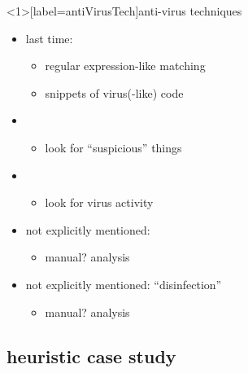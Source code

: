 \begin{frame}<1>[label=antiVirusTech]{anti-virus techniques}
    \begin{itemize}
    \item last time: 
        \begin{itemize}
        \item regular expression-like matching
        \item snippets of virus(-like) code
        \end{itemize}
    \item {}
        \begin{itemize}
        \item look for ``suspicious'' things
        \end{itemize}
    \item {}
        \begin{itemize}
        \item look for virus activity
        \end{itemize}
    \item not explicitly mentioned: 
        \begin{itemize}
        \item manual? analysis
        \end{itemize}
    \item not explicitly mentioned: ``disinfection''
        \begin{itemize}
        \item manual? analysis
        \end{itemize}
    \end{itemize}
\end{frame}

\subsection{heuristic case study}

